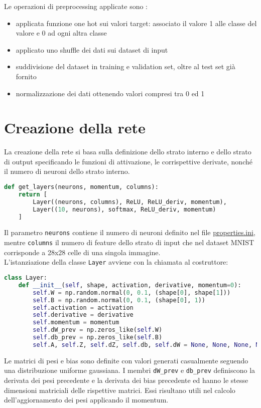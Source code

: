 Le operazioni di preprocessing applicate sono :
\begin{itemize}
    \item applicata funzione one hot sui valori target: associato il valore 1 alle classe del valore e 0 ad ogni altra classe
    \item applicato uno shuffle dei dati sui dataset di input
    \item suddivisione del dataset in training e validation set, oltre al test set già fornito
    \item normalizzazione dei dati ottenendo valori compresi tra 0 ed 1
\end{itemize}

\section{Creazione della rete}
La creazione della rete si basa sulla definizione dello strato interno e dello strato di output specificando le funzioni di attivazione, le corrispettive derivate, nonché il numero di neuroni dello strato interno.
\begin{lstlisting}[language=Python]
def get_layers(neurons, momentum, columns):
    return [
        Layer((neurons, columns), ReLU, ReLU_deriv, momentum), 
        Layer((10, neurons), softmax, ReLU_deriv, momentum)
    ]
\end{lstlisting}
Il parametro \texttt{neurons} contiene il numero di neuroni definito nel file \underline{properties.ini}, mentre \texttt{columns} il numero di feature dello strato di input che nel dataset MNIST corrisponde a 28x28 celle di una singola immagine. \\
L'istanziazione della classe \texttt{Layer} avviene con la chiamata al costruttore:
\begin{lstlisting}[language=Python]
class Layer:
    def __init__(self, shape, activation, derivative, momentum=0):
        self.W = np.random.normal(0, 0.1, (shape[0], shape[1]))
        self.B = np.random.normal(0, 0.1, (shape[0], 1))
        self.activation = activation
        self.derivative = derivative
        self.momentum = momentum
        self.dW_prev = np.zeros_like(self.W)
        self.db_prev = np.zeros_like(self.B)
        self.A, self.Z, self.dZ, self.db, self.dW = None, None, None, None, None
\end{lstlisting}
Le matrici di pesi e bias sono definite con valori generati casualmente seguendo una distribuzione uniforme gaussiana. I membri \texttt{dW\_prev} e \texttt{db\_prev} definiscono la derivata dei pesi precedente e la derivata dei bias precedente ed hanno le stesse dimensioni matriciali delle rispettive matrici. Essi risultano utili nel calcolo dell'aggiornamento dei pesi applicando il momentum. \\

